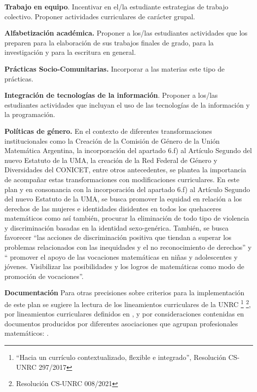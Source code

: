 \documentclass[a4paper, 12pt]{article}
\begin{document}
\begin{description}
\item{\textbf{Trabajo en equipo}.} Incentivar en el/la estudiante estrategias de trabajo colectivo. Proponer actividades curriculares   de carácter  grupal.



\item{ \textbf{Alfabetización académica.}} Proponer a los/las estudiantes actividades que los preparen para la
elaboración de sus trabajos finales de grado, para la investigación y para la escritura en general. 




\item{\textbf{Prácticas Socio-Comunitarias.} } Incorporar a las materias este tipo de prácticas.


\item{ \textbf{Integración de tecnologías de la información}.} Proponer a los/las estudiantes actividades que incluyan el uso de las tecnologías de la información y la programación.  



\item{\textbf{Políticas de género.}}
En el contexto de diferentes transformaciones institucionales como la Creación de la Comisión de Género de la Unión Matemática Argentina, la incorporación del apartado 6.f) al Artículo Segundo del nuevo Estatuto de la UMA, la creación de la Red Federal de Género y Diversidades del CONICET, entre otros antecedentes, se plantea la importancia de acompañar estas transformaciones con  modificaciones curriculares. 
En este plan y en consonancia con la incorporación del apartado 6.f) al Artículo Segundo del nuevo Estatuto de la UMA, se  busca promover la equidad en relación a los derechos de las mujeres e identidades disidentes en todos los quehaceres matemáticos  como así también,  procurar la eliminación de todo tipo de violencia y discriminación basadas en la identidad sexo-genérica.
También, se busca favorecer “las acciones de discriminación positiva que tiendan a superar los problemas relacionados con las inequidades y el no reconocimiento de derechos”  y    “ promover el apoyo de las vocaciones matemáticas en niñas y adolescentes y jóvenes. Visibilizar las posibilidades y los logros de matemáticas como modo de promoción de vocaciones”.
 
 \item{\textbf{Documentación}} Para otras precisiones sobre criterios para la implementación de este plan se sugiere la lectura de los lineamientos curriculares de la UNRC \footnote{``Hacia   un   currículo contextualizado, flexible e integrado'', Resolución CS-UNRC 297/2017 }
\footnote{ Resolución CS-UNRC 008/2021}, por lineamientos curriculares definidos en  \cite{paniagua2013educacion}, y por consideraciones contenidas en documentos producidos por diferentes asociaciones que agrupan profesionales matemáticos: \cite{uma,society1996siam,society2012siam,damlamian2013educational}.

\end{description}
\end{document}
